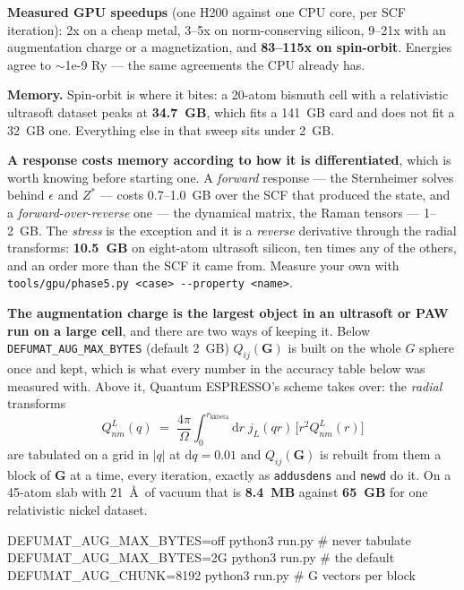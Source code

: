 \documentclass[11pt,a4paper]{article}
\newcommand{\qe}{Quantum ESPRESSO}
\newcommand{\code}[1]{\texttt{\small #1}}
\begin{document}
\textbf{Measured GPU speedups} (one H200 against one CPU core, per SCF
iteration): 2x on a cheap metal, 3--5x on norm-conserving silicon, 9--21x with
an augmentation charge or a magnetization, and \textbf{83--115x on spin-orbit}.
Energies agree to $\sim$1e-9 Ry --- the same agreements the CPU already has.

\textbf{Memory.} Spin-orbit is where it bites: a 20-atom bismuth cell with a
relativistic ultrasoft dataset peaks at \textbf{34.7~GB}, which fits a 141~GB
card and does not fit a 32~GB one. Everything else in that sweep sits under
2~GB.

\textbf{A response costs memory according to how it is differentiated}, which is
worth knowing before starting one. A \emph{forward} response --- the Sternheimer
solves behind $\epsilon$ and $Z^*$ --- costs 0.7--1.0~GB over the SCF that
produced the state, and a \emph{forward-over-reverse} one --- the dynamical
matrix, the Raman tensors --- 1--2~GB. The \emph{stress} is the exception and it
is a \emph{reverse} derivative through the radial transforms: \textbf{10.5~GB}
on eight-atom ultrasoft silicon, ten times any of the others, and an order more
than the SCF it came from. Measure your own with
\code{tools/gpu/phase5.py <case> -{}-property <name>}.

\textbf{The augmentation charge is the largest object in an ultrasoft or PAW
run on a large cell}, and there are two ways of keeping it. Below
\code{DEFUMAT\_AUG\_MAX\_BYTES} (default 2~GB) $Q_{ij}(\mathbf{G})$ is built on
the whole $G$ sphere once and kept, which is what every number in the accuracy
table below was measured with. Above it, \qe's scheme takes over: the
\emph{radial} transforms
%
\begin{equation*}
  Q^L_{nm}(q) \;=\; \frac{4\pi}{\Omega}\int_0^{r_{\mathrm{kkbeta}}}\!\!
  \mathrm{d}r\; j_L(qr)\,\bigl[r^2 Q^L_{nm}(r)\bigr]
\end{equation*}
%
are tabulated on a grid in $|q|$ at $\mathrm{d}q = 0.01$ and
$Q_{ij}(\mathbf{G})$ is rebuilt from them a block of $\mathbf{G}$ at a time,
every iteration, exactly as \code{addusdens} and \code{newd} do it. On a
45-atom slab with 21~\AA\ of vacuum that is \textbf{8.4~MB} against
\textbf{65~GB} for one relativistic nickel dataset.

\begin{shcode}
DEFUMAT_AUG_MAX_BYTES=off python3 run.py   # never tabulate
DEFUMAT_AUG_MAX_BYTES=2G  python3 run.py   # the default
DEFUMAT_AUG_CHUNK=8192    python3 run.py   # G vectors per block
\end{shcode}
\end{document}
